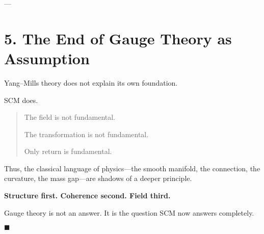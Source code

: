 ---

\section{5. The End of Gauge Theory as Assumption} \label{sec:end-gauge}

Yang–Mills theory does not explain its own foundation.

SCM does.

\begin{quote}
The field is not fundamental.

The transformation is not fundamental.

Only return is fundamental.
\end{quote}

Thus, the classical language of physics—the smooth manifold, the connection, the curvature, the mass gap—are shadows of a deeper principle.

\textbf{Structure first. Coherence second. Field third.}

Gauge theory is not an answer. It is the question SCM now answers completely.

\hfill$\blacksquare$
